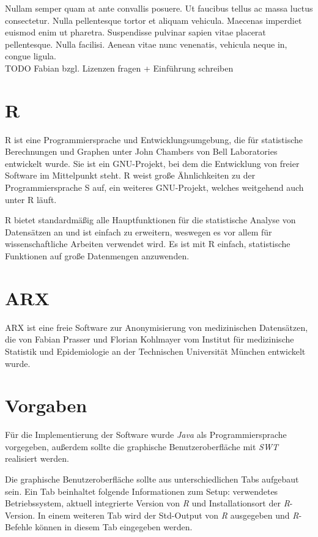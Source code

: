 \documentclass[a4paper, 12pt]{report} %
\begin{document}
Nullam semper quam at ante convallis posuere. Ut faucibus tellus ac massa luctus consectetur. Nulla pellentesque tortor et aliquam vehicula. Maecenas imperdiet euismod enim ut pharetra. Suspendisse pulvinar sapien vitae placerat pellentesque. Nulla facilisi. Aenean vitae nunc venenatis, vehicula neque in, congue ligula.\\

TODO Fabian bzgl. Lizenzen fragen + Einführung schreiben


\section*{R}\label{r}
R ist eine Programmiersprache und Entwicklungsumgebung, die für statistische Berechnungen und Graphen unter John Chambers von Bell Laboratories entwickelt wurde. Sie ist ein GNU-Projekt, bei dem die Entwicklung von freier Software im Mittelpunkt steht. R weist große Ähnlichkeiten zu der Programmiersprache S auf, ein weiteres GNU-Projekt, welches weitgehend auch unter R läuft. \cite{rproject}

R bietet standardmäßig alle Hauptfunktionen für die statistische Analyse von Datensätzen an und ist einfach zu erweitern, weswegen es vor allem für wissenschaftliche Arbeiten verwendet wird. Es ist mit R einfach, statistische Funktionen auf große Datenmengen anzuwenden.  



\section*{ARX}
ARX ist eine freie Software zur Anonymisierung von medizinischen Datensätzen, die von Fabian Prasser und Florian Kohlmayer vom Institut für medizinische Statistik und Epidemiologie an der Technischen Universität München entwickelt wurde.


\section*{Vorgaben}

Für die Implementierung der Software wurde \textit{Java} als Programmiersprache vorgegeben, außerdem sollte die graphische Benutzeroberfläche mit \textit{SWT} realisiert werden.

Die graphische Benutzeroberfläche sollte aus unterschiedlichen Tabs aufgebaut sein. Ein Tab beinhaltet folgende Informationen zum Setup: verwendetes Betriebssystem, aktuell integrierte Version von \textit{R} und Installationsort der \textit{R}-Version. In einem weiteren Tab wird der Std-Output von \textit{R} ausgegeben und \textit{R}-Befehle können in diesem Tab eingegeben werden. 
\end{document}
